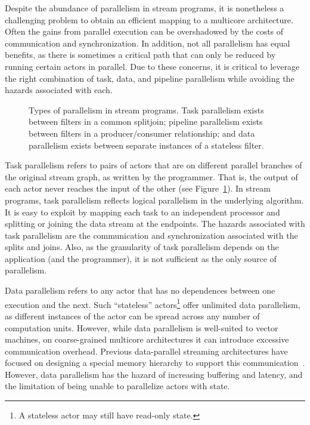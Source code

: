 
Despite the abundance of parallelism in stream programs, it is
nonetheless a challenging problem to obtain an efficient mapping to a
multicore architecture.  Often the gains from parallel execution can
be overshadowed by the costs of communication and synchronization.  In
addition, not all parallelism has equal benefits, as there is
sometimes a critical path that can only be reduced by running certain
actors in parallel.  Due to these concerns, it is critical to leverage
the right combination of task, data, and pipeline parallelism while
avoiding the hazards associated with each.

\begin{figure}[t]
\centering
{}
\caption[Types of parallelism in stream programs.]{Types of parallelism
  in stream programs.  Task parallelism exists between filters in a
  common splitjoin; pipeline parallelism exists between filters in a
  producer/consumer relationship; and data parallelism exists between
  separate instances of a stateless
  filter.\protect\label{fig:parallelism}}
\end{figure}

Task parallelism refers to pairs of actors that are on different
parallel branches of the original stream graph, as written by the
programmer.  That is, the output of each actor never reaches the input
of the other (see Figure~\ref{fig:parallelism}).  In stream
programs, task parallelism reflects logical parallelism in the
underlying algorithm.  It is easy to exploit by mapping each task to
an independent processor and splitting or joining the data stream at
the endpoints.  The hazards associated with task parallelism are the
communication and synchronization associated with the splits and
joins.  Also, as the granularity of task parallelism depends on the
application (and the programmer), it is not sufficient as the only
source of parallelism.

Data parallelism refers to any actor that has no dependences between
one execution and the next.  Such ``stateless'' actors\footnote{A
  stateless actor may still have read-only state.}  offer unlimited
data parallelism, as different instances of the actor can be spread
across any number of computation units.  However, while data
parallelism is well-suited to vector machines, on coarse-grained
multicore architectures it can introduce excessive communication
overhead.  Previous data-parallel streaming architectures have focused
on designing a special memory hierarchy to support this
communication~\cite{imagine03ieee}.  However, data parallelism has the
hazard of increasing buffering and latency, and the limitation of
being unable to parallelize actors with state.

